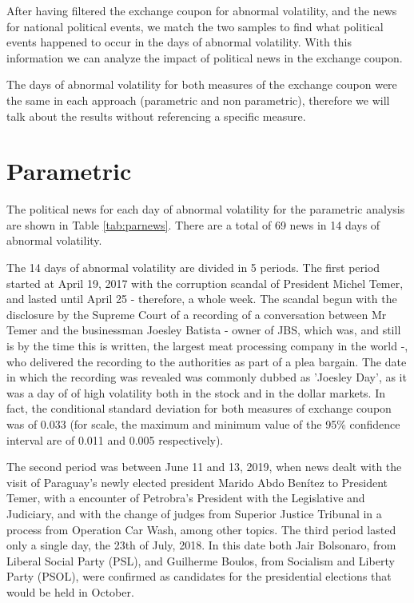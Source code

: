\documentclass[cic,tc, english]{iiufrgs}
\begin{document}
    After having filtered the exchange coupon for abnormal volatility, and the news for national political events, we match the two samples to find what political events happened to occur in the days of abnormal volatility. With this information we can analyze the impact of political news in the exchange coupon.

    The days of abnormal volatility for both measures of the exchange coupon were the same in each approach (parametric and non parametric), therefore we will talk about the results without referencing a specific measure.

\section{Parametric}

    The political news for each day of abnormal volatility for the parametric analysis are shown in Table \ref{tab:parnews}. There are a total of 69 news in 14 days of abnormal volatility.

    

    The 14 days of abnormal volatility are divided in 5 periods. The first period started at April 19, 2017 with the corruption scandal of President Michel Temer, and lasted until April 25 - therefore, a whole week. The scandal begun with the disclosure by the Supreme Court of a recording of a conversation between Mr Temer and the businessman Joesley Batista - owner of JBS, which was, and still is by the time this is written, the largest meat processing company in the world -, who delivered the recording to the authorities as part of a plea bargain. The date in which the recording was revealed was commonly dubbed as 'Joesley Day', as it was a day of of high volatility both in the stock and in the dollar markets. In fact, the conditional standard deviation for both measures of exchange coupon was of 0.033 (for scale, the maximum and minimum value of the 95\% confidence interval are of 0.011 and 0.005 respectively).

    The second period was between June 11 and 13, 2019, when news dealt with the visit of Paraguay's newly elected president Marido Abdo Benítez to President Temer, with a encounter of Petrobra's President with the Legislative and Judiciary, and with the change of judges from Superior Justice Tribunal in a process from Operation Car Wash, among other topics. The third period lasted only a single day, the 23th of July, 2018. In this date both Jair Bolsonaro, from Liberal Social Party (PSL), and Guilherme Boulos, from Socialism and Liberty Party (PSOL), were confirmed as candidates for the presidential elections that would be held in October.
\end{document}
